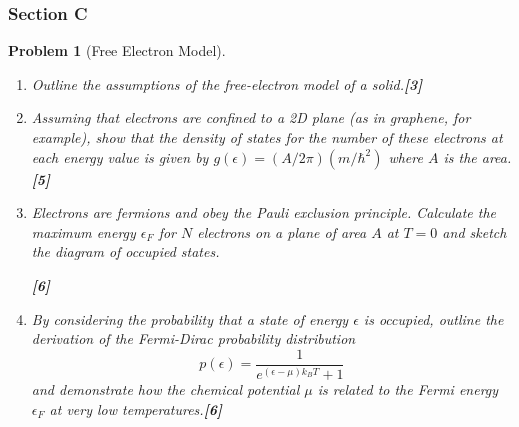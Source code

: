 \documentclass[a4paper]{article}
\theoremstyle{new}
\newtheorem{qns}{Problem}[subsection]
\begin{document}
\subsubsection{Section C}
\begin{qns}[Free Electron Model]\leavevmode
\begin{enumerate}[label=(\roman*)]
\item Outline the assumptions of the free-electron model of a solid.\hfill\textbf{[3]}
\item Assuming that electrons are confined to a 2D plane (as in graphene, for example), show that the density of states for the number of these electrons at each energy value is given by $g(\epsilon) = (A/2\pi)(m/\hbar^2)$ where $A$ is the area.\hfill\textbf{[5]}
\item Electrons are fermions and obey the Pauli exclusion principle. Calculate the maximum energy $\epsilon_F$ for $N$ electrons on a plane of area $A$ at $T = 0$ and sketch the diagram of occupied states.

\hfill\textbf{[6]}
\item By considering the probability that a state of energy $\epsilon$ is occupied, outline the derivation of the Fermi-Dirac probability distribution
$$p(\epsilon)=\frac{1}{e^{(\epsilon-\mu)k_BT}+1}$$
and demonstrate how the chemical potential $\mu$ is related to the Fermi energy $\epsilon_F$ at very low temperatures.\hfill\textbf{[6]}
\end{enumerate}
\end{qns}
\end{document}

